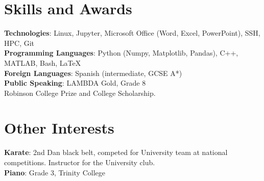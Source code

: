 \documentclass[a4paper,11pt]{article}
\begin{document}
\section{Skills and Awards}
\begin{itemize}[leftmargin=0.15in, label={}]
    \normalsize{\item{
     \textbf{Technologies}{: Linux, Jupyter, Microsoft Office (Word, Excel, PowerPoint), SSH, HPC, Git} \\
     \textbf{Programming Languages}{: Python (Numpy, Matplotlib, Pandas), C++, MATLAB, Bash, LaTeX} \\
     \textbf{Foreign Languages}{: Spanish (intermediate, GCSE A*)}\\
     \textbf{Public Speaking}{: LAMBDA Gold, Grade 8} \\
     Robinson College Prize and College Scholarship.
    }}
 \end{itemize}
 
\section{Other Interests}
\begin{itemize}[leftmargin=0.15in, label={}]
    \normalsize{\item{
     \textbf{Karate}{: 2nd Dan black belt, competed for University team at national competitions. Instructor for the University club.} \\
      \textbf{Piano}{: Grade 3, Trinity College}
    }}    
 \end{itemize}
\end{document}
